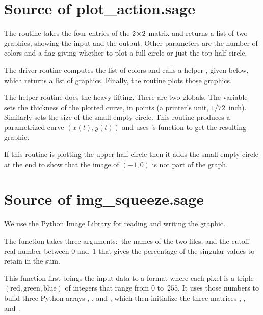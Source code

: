\section{Source of plot\_action.sage}

The 
routine takes the four entries of the $2 \! \times \! 2$
matrix and returns a list of two graphics, showing the input and the
output.
Other parameters are the number of colors and a flag giving whether
to plot a full circle or just the top half circle.

The driver routine computes the list of colors and 
calls a helper , 
given below, which returns a list of graphics.
Finally, the routine plots those graphics.


The helper routine does the heavy lifting.
There are two globals.
The variable  sets the thickness of 
the plotted curve, in points (a printer's unit, $1/72$~inch).
Similarly  sets the size of the small empty circle.
This routine produces a parametrized curve $(x(t),y(t))$ and uses \Sage's
 function to get the resulting graphic.

If this routine is plotting the upper half circle then it adds the
small empty circle at the end to show that the image of $(-1,0)$
is not part of the graph.




\section{Source of img\_squeeze.sage}
We use the Python Image Library for reading and writing the graphic.

The function
takes three arguments:~the names of the two files, and
the cutoff real number between $0$ and~$1$ that gives the percentage 
of the singular values to retain in the sum.


This function first brings the input data to a format where each
pixel is a triple 
$(\text{red}, \text{green},\text{blue})$ of integers that range from 
$0$ to~$255$.
It uses those numbers to build 
three Python arrays , ,
and , which then initialize the 
three \Sage{} matrices ,
, and~.



